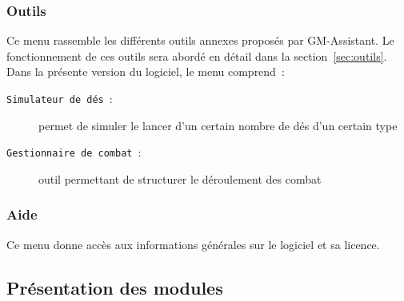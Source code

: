 \documentclass[a4paper,12pt]{article}
\newcommand*{\GMA}{GM-Assistant\xspace}
\newcommand*{\interfaceitem}[1]{\texttt{#1}}
\begin{document}
\subsubsection{Outils}
\label{sec:menu_outils}

Ce menu rassemble les différents outils annexes proposés par \GMA.
Le fonctionnement de ces outils sera abordé en détail dans la section~\ref{sec:outils}.
Dans la présente version du logiciel, le menu comprend~:
\begin{description}
    \item[\interfaceitem{Simulateur de dés}~:]{permet de simuler le lancer d'un certain nombre de dés d'un certain type}
    \item[\interfaceitem{Gestionnaire de combat}~:]{outil permettant de structurer le déroulement des combat}
\end{description}

\subsubsection{Aide}
\label{sec:aide}

Ce menu donne accès aux informations générales sur le logiciel et sa licence.

\subsection{Présentation des modules}
\label{sec:modules}
\end{document}
